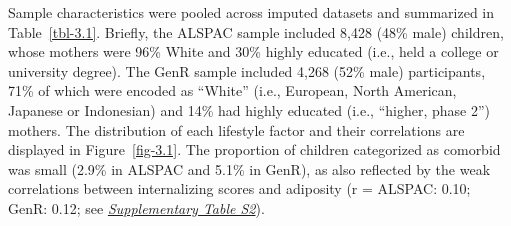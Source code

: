 \documentclass[
  letterpaper,
  DIV=11,
  numbers=noendperiod]{scrreport}
\begin{document}
Sample characteristics were pooled across imputed datasets and
summarized in Table~\ref{tbl-3.1}. Briefly, the ALSPAC sample included
8,428 (48\% male) children, whose mothers were 96\% White and 30\%
highly educated (i.e., held a college or university degree). The GenR
sample included 4,268 (52\% male) participants, 71\% of which were
encoded as ``White'' (i.e., European, North American, Japanese or
Indonesian) and 14\% had highly educated (i.e., ``higher, phase 2'')
mothers. The distribution of each lifestyle factor and their
correlations are displayed in Figure~\ref{fig-3.1}. The proportion of
children categorized as comorbid was small (2.9\% in ALSPAC and 5.1\% in
GenR), as also reflected by the weak correlations between internalizing
scores and adiposity (r = ALSPAC: 0.10; GenR: 0.12; see
\href{https://osf.io/x9g6b}{\emph{Supplementary Table S2}}).
\end{document}
